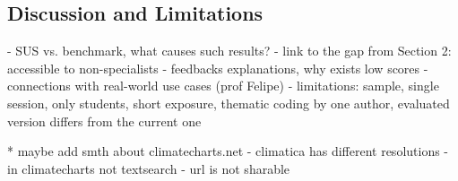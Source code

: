 \subsection{Discussion and Limitations}\label{sec:evaluation:discussion}
- SUS vs. benchmark, what causes such results?
- link to the gap from Section 2: accessible to non-specialists
- feedbacks explanations, why exists low scores
- connections with real-world use cases (prof Felipe)
- limitations: sample, single session, only students, short exposure, thematic coding 
by one author, evaluated version differs from the current one


* maybe add smth about climatecharts.net
- climatica has different resolutions
- in climatecharts not textsearch
- url is not sharable